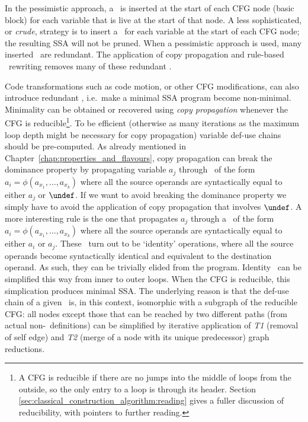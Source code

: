 In the pessimistic approach, a \phifun\ is inserted at the start of each CFG node
(basic block) for each variable that is live at the start of that
node.
A less sophisticated, or \textit{crude}, %
strategy is to insert a \phifun\ for
each variable at the start of each CFG node;
the resulting SSA will not be pruned.
When a pessimistic approach is used, many inserted \phifuns\ are
redundant. The application of 
copy propagation and rule-based \phifun\ rewriting
removes many of these redundant \phifuns.


Code transformations such as code motion, or other CFG modifications, 
can also introduce redundant \phifuns, i.e.\
make a minimal SSA program become non-minimal.
Minimality can be obtained or recovered using 
\textit{copy propagation} whenever the CFG is reducible\footnote{
A CFG is reducible if there are no jumps into the middle of loops
from the outside, so the only entry to a loop is through its header.
Section \ref{sec:classical_construction_algorithm:reading} 
gives a fuller discussion of reducibility, with
pointers to further reading.
}.
To be efficient (otherwise as many iterations as the maximum loop
depth might be necessary for copy propagation)
variable def-use chains should be pre-computed. 
As already mentioned in Chapter~\ref{chap:properties_and_flavours}, 
copy propagation can break the dominance property by propagating
variable $a_j$ through \phifuns\ of the form $a_i=\phi(a_{x_1},\ldots,a_{x_k})$ where
all the source operands are syntactically equal to either $a_j$ or $\undef$. 
If we want to avoid breaking the dominance property we simply have to
avoid the application of copy propagation that involves $\undef$. 
A more interesting rule is the one that propagates $a_j$ through a
\phifun\ of the form $a_i=\phi(a_{x_1},\ldots,a_{x_k})$ where all the source operands are
syntactically equal to either $a_i$ or $a_j$. 
These \phifuns\ turn out to be `identity' operations, where all the
source operands become syntactically identical and equivalent to the 
destination operand. As such, they can be trivially elided from the program.
Identity \phifuns\ can be simplified this way from inner to outer loops. 
When the CFG is reducible, this simplication produces minimal SSA. 
The underlying reason is that the def-use chain of a given \phiweb\ is,
in this context, isomorphic with a subgraph of the reducible CFG: 
all nodes except those that can be reached by two different paths (from
actual non-\phifun\ definitions) can be simplified by iterative 
application of 
\emph{T1} (removal of self edge) and 
\emph{T2} (merge of a node with its unique predecessor) graph reductions.
